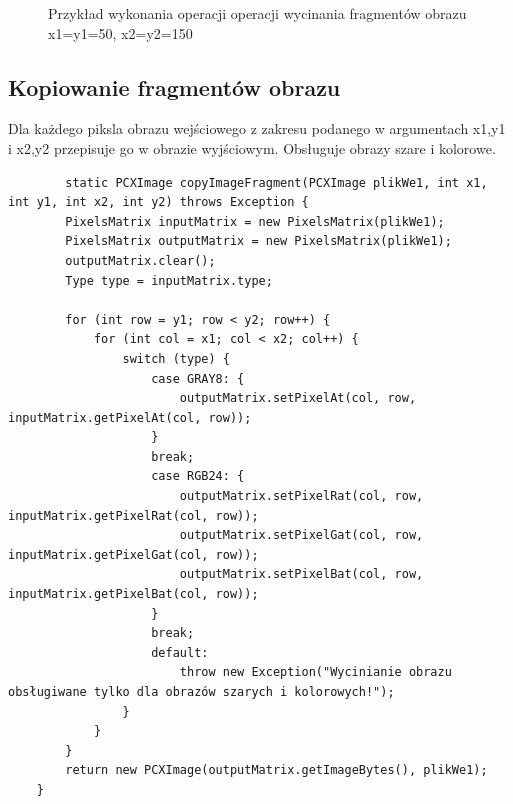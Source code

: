 \documentclass{article}
\begin{document}
\begin{figure}[!ht]
	\caption{Przykład wykonania operacji operacji wycinania fragmentów obrazu x1=y1=50, x2=y2=150}
	\label{fig13}	
	\end{figure}
	
	
	\subsection{Kopiowanie fragmentów obrazu}
	Dla każdego piksla obrazu wejściowego z zakresu podanego w argumentach x1,y1 i x2,y2 przepisuje go w obrazie wyjściowym.
	Obsługuje obrazy szare i kolorowe.
	
	\begin{verbatim}
        static PCXImage copyImageFragment(PCXImage plikWe1, int x1, int y1, int x2, int y2) throws Exception {
        PixelsMatrix inputMatrix = new PixelsMatrix(plikWe1);
        PixelsMatrix outputMatrix = new PixelsMatrix(plikWe1);
        outputMatrix.clear();
        Type type = inputMatrix.type;

        for (int row = y1; row < y2; row++) {
            for (int col = x1; col < x2; col++) {
                switch (type) {
                    case GRAY8: {
                        outputMatrix.setPixelAt(col, row, inputMatrix.getPixelAt(col, row));
                    }
                    break;
                    case RGB24: {
                        outputMatrix.setPixelRat(col, row, inputMatrix.getPixelRat(col, row));
                        outputMatrix.setPixelGat(col, row, inputMatrix.getPixelGat(col, row));
                        outputMatrix.setPixelBat(col, row, inputMatrix.getPixelBat(col, row));
                    }
                    break;
                    default:
                        throw new Exception("Wycinianie obrazu obsługiwane tylko dla obrazów szarych i kolorowych!");
                }
            }
        }
        return new PCXImage(outputMatrix.getImageBytes(), plikWe1);
    }
	\end{verbatim}
\end{document}
